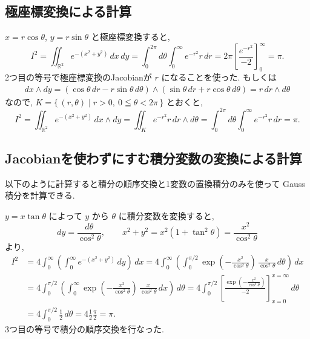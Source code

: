 \documentclass[12pt,twoside]{jarticle}
\newcommand\R{{\mathbb R}} %
\theoremstyle{jplain}
\theoremstyle{jplain}
\theoremstyle{jplain}
\numberwithin{theorem}{section}
\numberwithin{equation}{section}
\numberwithin{figure}{section}
\numberwithin{table}{section}
\begin{document}
\subsection{極座標変換による計算}

$x=r\cos\theta$, $y=r\sin\theta$ と極座標変換すると, 
\[
I^2
=\iint_{\R^2} e^{-(x^2+y^2)}\,dx\,dy
=\int_0^{2\pi}d\theta \int_0^\infty e^{-r^2}r \,dr
=2\pi\left[\frac{e^{-r^2}}{-2}\right]_0^\infty
=\pi.
\]
2つ目の等号で極座標変換のJacobianが $r$ になることを使った.
もしくは
\begin{align*}
dx\wedge dy
=(\cos\theta\,dr-r\sin\theta\,d\theta)\wedge
 (\sin\theta\,dr+r\cos\theta\,d\theta)
=r\,dr\wedge d\theta
\end{align*}
なので, $K=\{\,(r,\theta)\mid r>0,\ 0\leqq\theta<2\pi\,\}$ とおくと, 
\[
I^2
=\iint_{\R^2} e^{-(x^2+y^2)}\,dx\wedge dy
=\iint_K e^{-r^2}r \,dr\wedge d\theta
=\int_0^{2\pi}d\theta \int_0^\infty e^{-r^2}r \,dr
=\pi.
\]


\subsection{Jacobianを使わずにすむ積分変数の変換による計算}
\label{sec:y=xt}

以下のように計算すると積分の順序交換と1変数の置換積分のみを使って
Gauss積分を計算できる.

$y=x\tan\theta$ によって $y$ から $\theta$ に積分変数を変換すると,
\[
dy = \frac{d\theta}{\cos^2\theta}, \qquad
x^2+y^2=x^2(1+\tan^2\theta) = \frac{x^2}{\cos^2\theta}
\]
より, 
\begin{align*}
I^2
&=4
\int_0^\infty
\left(
\int_0^\infty e^{-(x^2+y^2)}\,dy
\right)\,dx
=4
\int_0^\infty
\left(
\int_0^{\pi/2} \exp\left(-\frac{x^2}{\cos^2\theta}\right)\,\frac{x}{\cos^2\theta}\,d\theta
\right)\,dx
\\ &
=4
\int_0^{\pi/2}
\left(
\int_0^\infty \exp\left(-\frac{x^2}{\cos^2\theta}\right)\,\frac{x}{\cos^2\theta}\,dx 
\right)\,d\theta
=4
\int_0^{\pi/2}
\left[
\frac{\exp\left(-\frac{x^2}{\cos^2\theta}\right)}{-2}
\right]_{x=0}^{x=\infty}
\,d\theta
\\ &
=4
\int_0^{\pi/2}\frac{1}{2}\,d\theta
=4\frac{1}{2}\frac{\pi}{2}
=\pi.
\end{align*}
3つ目の等号で積分の順序交換を行なった.
\end{document}
